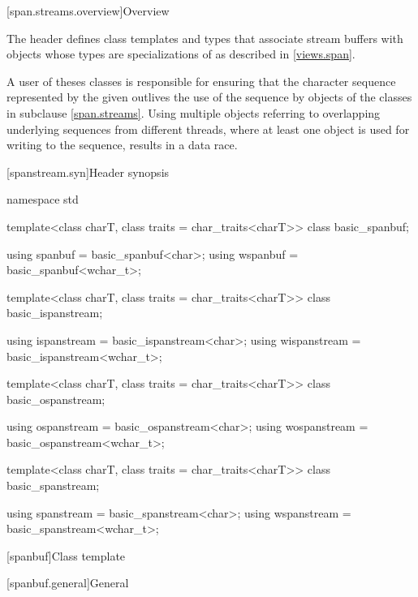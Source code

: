 [span.streams.overview]{Overview}

\pnum
The header  defines class templates and types
that associate stream buffers with objects whose types are
specializations of  as described in \ref{views.span}.
\begin{note}
A user of theses classes is responsible for ensuring
that the character sequence represented by the given 
outlives the use of the sequence by objects of the classes in subclause \ref{span.streams}.
Using multiple  objects
referring to overlapping underlying sequences from different threads,
where at least one  object is used
for writing to the sequence,
results in a data race.
\end{note}

[spanstream.syn]{Header  synopsis}

%
%
%
%
%
%
%
%
\begin{codeblock}
namespace std {
  template<class charT, class traits = char_traits<charT>>
    class basic_spanbuf;

  using spanbuf = basic_spanbuf<char>;
  using wspanbuf = basic_spanbuf<wchar_t>;

  template<class charT, class traits = char_traits<charT>>
    class basic_ispanstream;

  using ispanstream = basic_ispanstream<char>;
  using wispanstream = basic_ispanstream<wchar_t>;

  template<class charT, class traits = char_traits<charT>>
    class basic_ospanstream;

  using ospanstream = basic_ospanstream<char>;
  using wospanstream = basic_ospanstream<wchar_t>;

  template<class charT, class traits = char_traits<charT>>
    class basic_spanstream;

  using spanstream = basic_spanstream<char>;
  using wspanstream = basic_spanstream<wchar_t>;
}
\end{codeblock}

[spanbuf]{Class template }

[spanbuf.general]{General}

